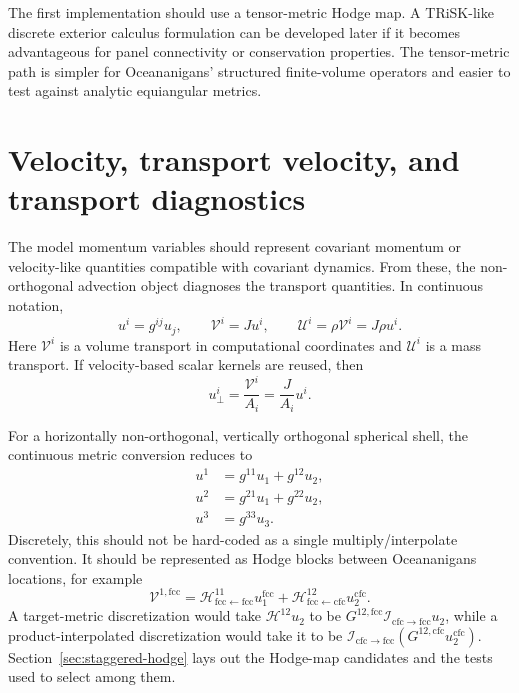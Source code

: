 \documentclass[11pt]{article}
\newcommand{\mc}[1]{\mathcal{#1}}
\newcommand{\Interp}{\mc{I}}
\newcommand{\Hodge}{\mc{H}}
\newcommand{\Vflux}{\mc{V}}
\newcommand{\Uflux}{\mc{U}}
\newcommand{\loc}[1]{^{\mathrm{#1}}}
\begin{document}
The first implementation should use a tensor-metric Hodge map.  A TRiSK-like discrete exterior calculus formulation can be developed later if it becomes advantageous for panel connectivity or conservation properties.  The tensor-metric path is simpler for Oceananigans' structured finite-volume operators and easier to test against analytic equiangular metrics.

\section{Velocity, transport velocity, and transport diagnostics}
\label{sec:diagnostics}

The model momentum variables should represent covariant momentum or velocity-like quantities compatible with covariant dynamics.  From these, the non-orthogonal advection object diagnoses the transport quantities.  In continuous notation,
\begin{equation}
  u^i = g^{ij}u_j,
  \qquad
  \Vflux^i = J u^i,
  \qquad
  \Uflux^i = \rho \Vflux^i = J\rho u^i.
  \label{eq:diagnostic-transport-chain}
\end{equation}
Here \(\Vflux^i\) is a volume transport in computational coordinates and \(\Uflux^i\) is a mass transport.  If velocity-based scalar kernels are reused, then
\begin{equation}
  u_\perp^i = \frac{\Vflux^i}{A_i} = \frac{J}{A_i}u^i.
\end{equation}

For a horizontally non-orthogonal, vertically orthogonal spherical shell, the continuous metric conversion reduces to
\begin{align}
  u^1 &= g^{11}u_1 + g^{12}u_2, \\
  u^2 &= g^{21}u_1 + g^{22}u_2, \\
  u^3 &= g^{33}u_3.
\end{align}
Discretely, this should not be hard-coded as a single multiply/interpolate convention.  It should be represented as Hodge blocks between Oceananigans locations, for example
\begin{equation}
  \Vflux^{1,\mathrm{fcc}}
  =
  \Hodge^{11}_{\mathrm{fcc}\leftarrow\mathrm{fcc}}u_1\loc{fcc}
  +
  \Hodge^{12}_{\mathrm{fcc}\leftarrow\mathrm{cfc}}u_2\loc{cfc}.
  \label{eq:discrete-hodge-u1}
\end{equation}
A target-metric discretization would take \(\Hodge^{12}u_2\) to be \(G^{12,\mathrm{fcc}}\Interp_{\mathrm{cfc}\to\mathrm{fcc}}u_2\), while a product-interpolated discretization would take it to be \(\Interp_{\mathrm{cfc}\to\mathrm{fcc}}(G^{12,\mathrm{cfc}}u_2\loc{cfc})\).  Section~\ref{sec:staggered-hodge} lays out the Hodge-map candidates and the tests used to select among them.
\end{document}
